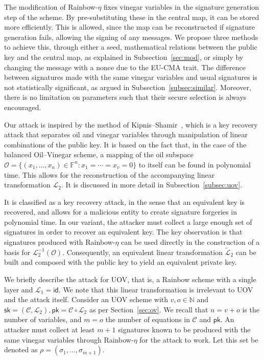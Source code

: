 \documentclass[12pt, a4paper, oneside]{memoir}
\theoremstyle{definition}
\begin{document}
The modification of Rainbow-$\eta$ fixes vinegar variables in the signature generation step of the scheme. By pre-substituting these in the central map, it can be stored more efficiently. This is allowed, since the map can be reconstructed if signature generation fails, allowing the signing of any messages. We propose three methods to achieve this, through either a seed, mathematical relations between the public key and the central map, as explained in Subsection~\ref{sec:mod}, or simply by changing the message with a nonce due to the EU-CMA trait. The difference between signatures made with the same vinegar variables and usual signatures is not statistically significant, as argued in Subsection~\ref{subsec:similar}. Moreover, there is no limitation on parameters such that their secure selection is always encouraged.



Our attack is inspired by the method of Kipnis--Shamir~\cite{Kipnis:199808}, which is a key recovery attack that separates oil and vinegar variables through manipulation of linear combinations of the public key. It is based on the fact that, in the case of the balanced Oil--Vinegar scheme, a mapping of the oil subspace $\mathcal{O} = \{ (x_{1}, \dots, x_{n}) \in \mathbb{F}^{n} : x_{1} = \cdots = x_{v} = 0 \}$ to itself can be found in polynomial time. This allows for the reconstruction of the accompanying linear transformation $\mathcal{L}_{2}$. It is discussed in more detail in Subsection~\ref{subsec:uov}.

It is classified as a key recovery attack, in the sense that an equivalent key is recovered, and allows for a malicious entity to create signature forgeries in polynomial time. In our variant, the attacker must collect a large enough set of signatures in order to recover an equivalent key. The key observation is that signatures produced with Rainbow-$\eta$ can be used directly in the construction of a basis for $\mathcal{L}_{2}^{-1}(\mathcal{O})$. Consequently, an equivalent linear transformation $\widetilde{\mathcal{L}}_{2}$ can be built and composed with the public key to yield an equivalent private key.

We briefly describe the attack for UOV, that is, a Rainbow scheme with a single layer and $\mathcal{L}_{1} = \textsf{id}$. We note that this linear transformation is irrelevant to UOV and the attack itself. Consider an UOV scheme with $v, o \in \mathbb{N}$ and $\mathsf{sk} = (\mathcal{C}, \mathcal{L}_{2}), \mathsf{pk} = \mathcal{C} \circ \mathcal{L}_{2}$ as per Section~\ref{sec:ov}. We recall that $n = v + o$ is the number of variables, and $m = o$ the number of equations in $\mathcal{C}$ and $\mathsf{pk}$. An attacker must collect at least $m + 1$ signatures known to be produced with the same vinegar variables through Rainbow-$\eta$ for the attack to work. Let this set be denoted as $\rho = (\sigma_{1}, \dots, \sigma_{m + 1})$. 
\end{document}
